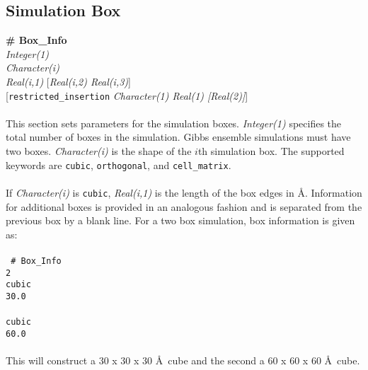 \subsection{Simulation Box}\label{sec:Box_Info}
{\bf \# Box\_Info} \\
{\it Integer(1)} \\
{\it Character(i)}  \\
{\it Real(i,1)} [{\it Real(i,2) Real(i,3)}] \\
{[}{\tt restricted\_insertion} {\it Character(1) Real(1) [Real(2)]}] \\ \\
This section sets parameters for the simulation boxes. 
{\it Integer(1)} specifies the total number of boxes in the simulation. 
Gibbs ensemble simulations must have two boxes. 
{\it Character(i)} is the shape of the $i$th simulation box. 
The supported keywords are \texttt{cubic}, \texttt{orthogonal}, and \texttt{cell\_matrix}. \\ \\
%
If {\it Character(i)} is \texttt{cubic}, \emph{Real(i,1)} is the length of the box edges in \AA. 
Information for additional boxes is provided in an analogous fashion
and is separated from the previous box by a blank line. 
For a two box simulation, box information is given as: \\ \\ 
%
\texttt{
\# Box\_Info \\
 2 \\
 cubic \\
 30.0  \\
 \\
 cubic \\
 60.0} \\ \\
%
This will construct a 30 x 30 x 30 \AA\ cube and the second a 60 x 60 x 60 \AA\ cube.

